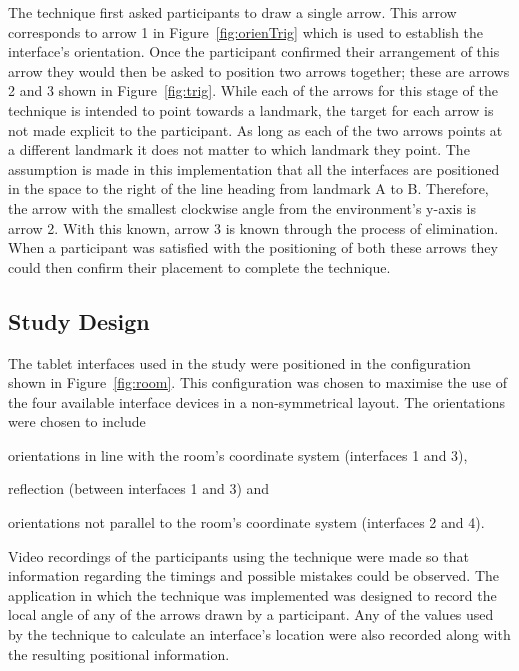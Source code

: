 \documentclass{bmcart}
\begin{document}
The technique first asked participants to draw a single arrow.
This arrow corresponds to arrow 1 in Figure~\ref{fig:orienTrig} which is used to establish the interface's orientation.
Once the participant confirmed their arrangement of this arrow they would then be asked to position two arrows together; these are arrows 2 and 3 shown in Figure~\ref{fig:trig}.
While each of the arrows for this stage of the technique is intended to point towards a landmark, the target for each arrow is not made explicit to the participant.
As long as each of the two arrows points at a different landmark it does not matter to which landmark they point.
The assumption is made in this implementation that all the interfaces are positioned in the space to the right of the line heading from landmark A to B.
Therefore, the arrow with the smallest clockwise angle from the environment's y-axis is arrow 2.
With this known, arrow 3 is known through the process of elimination.
When a participant was satisfied with the positioning of both these arrows they could then confirm their placement to complete the technique.

\subsection*{Study Design}\label{sec:design}

The tablet interfaces used in the study were positioned in the configuration shown in Figure~\ref{fig:room}.
This configuration was chosen to maximise the use of the four available interface devices in a non-symmetrical layout.
The orientations were chosen to include 
\begin{inparaenum}[(i)] 
\item orientations in line with the room's coordinate system (interfaces 1 and 3), 
\item reflection (between interfaces 1 and 3) and 
\item orientations not parallel to the room's coordinate system (interfaces 2 and 4).
\end{inparaenum}

Video recordings of the participants using the technique were made so that information regarding the timings and possible mistakes could be observed.
The application in which the technique was implemented was designed to record the local angle of any of the arrows drawn by a participant.
Any of the values used by the technique to calculate an interface's location were also recorded along with the resulting positional information.
\end{document}
